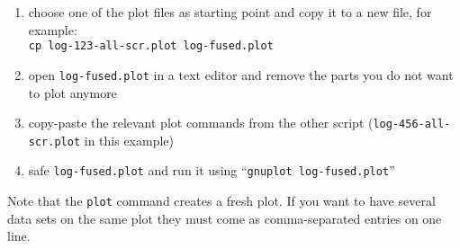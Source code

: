 \documentclass[a4paper,10pt]{article}
\begin{document}
\begin{enumerate}
\item
  choose one of the plot files as starting point and copy it to a new file, for example:\\
  \texttt{cp log-123-all-scr.plot log-fused.plot}
\item
  open \texttt{log-fused.plot} in a text editor and remove the parts you do not want to plot anymore
\item
  copy-paste the relevant plot commands from the other script (\texttt{log-456-all-scr.plot} in this example)
\item
  safe \texttt{log-fused.plot} and run it using ``\texttt{gnuplot log-fused.plot}''
\end{enumerate}

Note that the \texttt{plot} command creates a fresh plot.
If you want to have several data sets on the same plot they must come as comma-separated entries on one line.



\footnotesize


\end{document}

